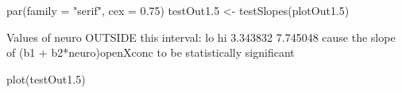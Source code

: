 \begin{Schunk}
\begin{Sinput}
 par(family = "serif", cex = 0.75)
 testOut1.5 <- testSlopes(plotOut1.5)
\end{Sinput}
\begin{Soutput}
Values of neuro OUTSIDE this interval:
      lo       hi 
3.343832 7.745048 
cause the slope of (b1 + b2*neuro)openXconc to be statistically significant
\end{Soutput}
\begin{Sinput}
 plot(testOut1.5)
\end{Sinput}
\end{Schunk}
